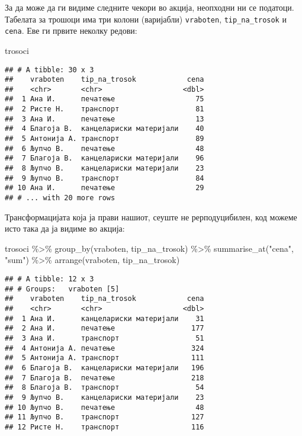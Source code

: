 \documentclass[
]{book}
\newenvironment{Shaded}{\begin{snugshade}}{\end{snugshade}}
\newcommand{\FunctionTok}[1]{\textcolor[rgb]{0.00,0.00,0.00}{#1}}
\newcommand{\NormalTok}[1]{#1}
\newcommand{\SpecialCharTok}[1]{\textcolor[rgb]{0.00,0.00,0.00}{#1}}
\newcommand{\StringTok}[1]{\textcolor[rgb]{0.31,0.60,0.02}{#1}}
\begin{document}
За да може да ги видиме следните чекори во акција, неопходни ни се податоци. Табелата за трошоци има три колони (варијабли) \texttt{vraboten}, \texttt{tip\_na\_trosok} и \texttt{cena}. Еве ги првите неколку редови:

\begin{Shaded}
\begin{Highlighting}[]
\NormalTok{trosoci}
\end{Highlighting}
\end{Shaded}

\begin{verbatim}
## # A tibble: 30 x 3
##    vraboten    tip_na_trosok            cena
##    <chr>       <chr>                   <dbl>
##  1 Ана И.      печатење                   75
##  2 Ристе Н.    транспорт                  81
##  3 Ана И.      печатење                   13
##  4 Благоја В.  канцелариски материјали    40
##  5 Антонија А. транспорт                  89
##  6 Љупчо В.    печатење                   48
##  7 Благоја В.  канцелариски материјали    96
##  8 Љупчо В.    канцелариски материјали    23
##  9 Љупчо В.    транспорт                  84
## 10 Ана И.      печатење                   29
## # ... with 20 more rows
\end{verbatim}

Трансформацијата која ја прави нашиот, сеуште не рерподуцибилен, код можеме исто така да ја видиме во акција:

\begin{Shaded}
\begin{Highlighting}[]
\NormalTok{trosoci }\SpecialCharTok{\%\textgreater{}\%} 
  \FunctionTok{group\_by}\NormalTok{(vraboten, tip\_na\_trosok) }\SpecialCharTok{\%\textgreater{}\%} 
  \FunctionTok{summarise\_at}\NormalTok{(}\StringTok{"cena"}\NormalTok{, }\StringTok{"sum"}\NormalTok{) }\SpecialCharTok{\%\textgreater{}\%} 
  \FunctionTok{arrange}\NormalTok{(vraboten, tip\_na\_trosok)}
\end{Highlighting}
\end{Shaded}

\begin{verbatim}
## # A tibble: 12 x 3
## # Groups:   vraboten [5]
##    vraboten    tip_na_trosok            cena
##    <chr>       <chr>                   <dbl>
##  1 Ана И.      канцелариски материјали    31
##  2 Ана И.      печатење                  177
##  3 Ана И.      транспорт                  51
##  4 Антонија А. печатење                  324
##  5 Антонија А. транспорт                 111
##  6 Благоја В.  канцелариски материјали   196
##  7 Благоја В.  печатење                  218
##  8 Благоја В.  транспорт                  54
##  9 Љупчо В.    канцелариски материјали    23
## 10 Љупчо В.    печатење                   48
## 11 Љупчо В.    транспорт                 127
## 12 Ристе Н.    транспорт                 116
\end{verbatim}
\end{document}
